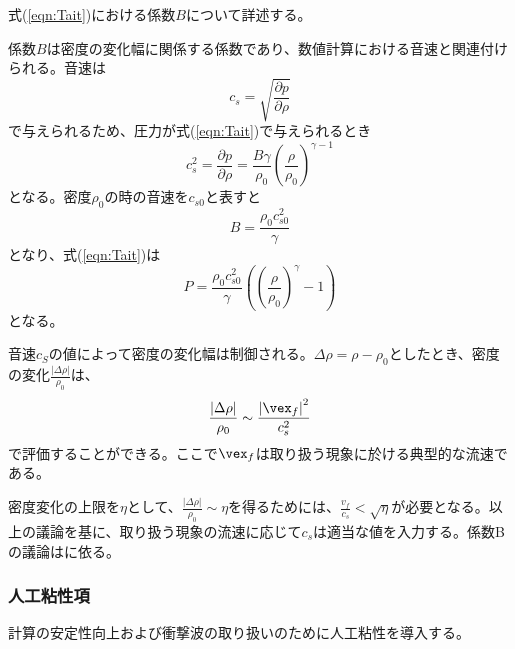 \documentclass[]{jsarticle}
\begin{document}
式(\ref{eqn:Tait})における係数$B$について詳述する。

係数$B$は密度の変化幅に関係する係数であり、数値計算における音速と関連付けられる。音速は
\begin{equation}
c_s=\sqrt{\frac{\partial p}{\partial \rho}}
\end{equation}
で与えられるため、圧力が式(\ref{eqn:Tait})で与えられるとき
\begin{equation}
c_s^2=\frac{\partial p}{\partial \rho}=\frac{B\gamma}{\rho_0}\left(\frac{\rho}{\rho_0}\right)^{\gamma -1}
\end{equation}
となる。密度$\rho_0$の時の音速を$c_{s0}$と表すと
\begin{equation}
B=\frac{\rho_0c_{s0}^2}{\gamma}
\end{equation}
となり、式(\ref{eqn:Tait})は
\begin{equation}
P=\frac{\rho_0c_{s0}^2}{\gamma}\left(\left(\frac{\rho}{\rho_0}\right)^\gamma-1\right)
\end{equation}
となる。

音速$c_S$の値によって密度の変化幅は制御される。$\Delta \rho=\rho-\rho_0$としたとき、密度の変化$\frac{\left| \Delta \rho \right|}{\rho_0}$は、
\begin{equation}
\frac{\left| \Delta \rho \right|}{\rho_0}\sim \frac{\left| \vex_f \right|^2}{c_s^2}
\end{equation}
で評価することができる。ここで$\vex_f$は取り扱う現象に於ける典型的な流速である。

密度変化の上限を$\eta$として、$\frac{\left| \Delta \rho \right|}{\rho_0}\sim \eta$を得るためには、$\frac{v_f}{c_s}<\sqrt{\eta}$が必要となる。以上の議論を基に、取り扱う現象の流速に応じて$c_s$は適当な値を入力する。係数Bの議論は\cite{Becker2007, Gotoh2018}に依る。


\subsubsection{人工粘性項}
計算の安定性向上および衝撃波の取り扱いのために人工粘性を導入する。
\end{document}
